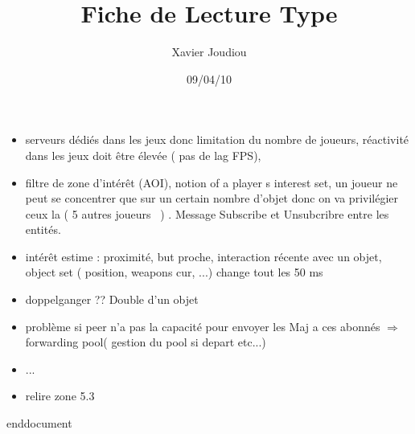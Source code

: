\documentclass[11pt,a4paper]{article}
\title{Fiche de Lecture Type}
\author{Xavier Joudiou}
\date{09/04/10}
\begin{document}
	
  \begin{itemize}
  \renewcommand{\labelitemi}{$\Rightarrow$}
	\item serveurs dédiés dans les jeux donc limitation du nombre de joueurs, réactivité dans les jeux doit être élevée ( pas de lag FPS),
	\item filtre de zone d'intérêt (AOI), notion of a player s interest set, un joueur ne peut se concentrer que sur un certain nombre d'objet donc on va privilégier ceux la ( 5 autres joueurs ~) . Message Subscribe et Unsubcribre entre les entités.
	\item intérêt estime : proximité, but proche, interaction récente avec un objet, object set ( position, weapons cur, ...) change tout les 50 ms
	\item doppelganger ?? Double d'un objet 
	\item problème si peer n'a pas la capacité  pour envoyer les Maj a ces abonnés $\Rightarrow$ forwarding pool( gestion du pool si depart etc...)
	\item ...
	\item relire zone 5.3
  \end{itemize}

end{document}  
\end{document}
